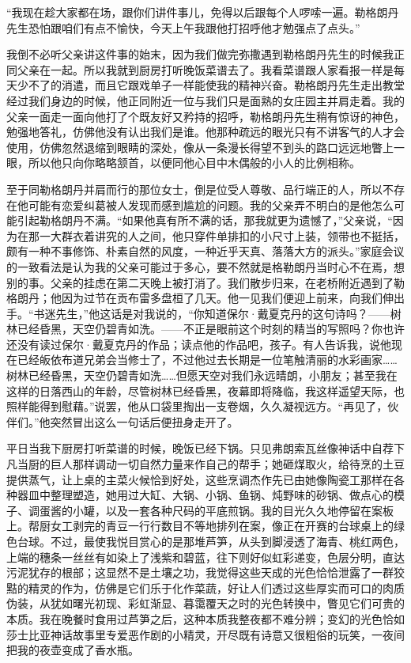 \par “我现在趁大家都在场，跟你们讲件事儿，免得以后跟每个人啰嗦一遍。勒格朗丹先生恐怕跟咱们有点不愉快，今天上午我跟他打招呼他才勉强点了点头。”
\par 我倒不必听父亲讲这件事的始末，因为我们做完弥撒遇到勒格朗丹先生的时候我正同父亲在一起。所以我就到厨房打听晚饭菜谱去了。我看菜谱跟人家看报一样是每天少不了的消遣，而且它跟戏单子一样能使我的精神兴奋。勒格朗丹先生走出教堂经过我们身边的时候，他正同附近一位与我们只是面熟的女庄园主并肩走着。我的父亲一面走一面向他打了个既友好又矜持的招呼，勒格朗丹先生稍有惊讶的神色，勉强地答礼，仿佛他没有认出我们是谁。他那种疏远的眼光只有不讲客气的人才会使用，仿佛忽然退缩到眼睛的深处，像从一条漫长得望不到头的路口远远地瞥上一眼，所以他只向你略略颔首，以便同他心目中木偶般的小人的比例相称。
\par 至于同勒格朗丹并肩而行的那位女士，倒是位受人尊敬、品行端正的人，所以不存在他可能有恋爱纠葛被人发现而感到尴尬的问题。我的父亲弄不明白的是他怎么可能引起勒格朗丹不满。“如果他真有所不满的话，那我就更为遗憾了，”父亲说，“因为在那一大群衣着讲究的人之间，他只穿件单排扣的小尺寸上装，领带也不挺括，颇有一种不事修饰、朴素自然的风度，一种近乎天真、落落大方的派头。”家庭会议的一致看法是认为我的父亲可能过于多心，要不然就是格勒朗丹当时心不在焉，想别的事。父亲的挂虑在第二天晚上被打消了。我们散步归来，在老桥附近遇到了勒格朗丹；他因为过节在贡布雷多盘桓了几天。他一见我们便迎上前来，向我们伸出手。“书迷先生，”他这话是对我说的，“你知道保尔·戴夏克丹的这句诗吗？——树林已经昏黑，天空仍碧青如洗。——不正是眼前这个时刻的精当的写照吗？你也许还没有读过保尔·戴夏克丹的作品；读点他的作品吧，孩子。有人告诉我，说他现在已经皈依布道兄弟会当修士了，不过他过去长期是一位笔触清丽的水彩画家……树林已经昏黑，天空仍碧青如洗……但愿天空对我们永远晴朗，小朋友；甚至我在这样的日落西山的年龄，尽管树林已经昏黑，夜幕即将降临，我这样遥望天际，也照样能得到慰藉。”说罢，他从口袋里掏出一支卷烟，久久凝视远方。“再见了，伙伴们。”他突然冒出这么一句话后便扭身走开了。
\par 平日当我下厨房打听菜谱的时候，晚饭已经下锅。只见弗朗索瓦丝像神话中自荐下凡当厨的巨人那样调动一切自然力量来作自己的帮手；她砸煤取火，给待烹的土豆提供蒸气，让上桌的主菜火候恰到好处，这些烹调杰作先已由她像陶瓷工那样在各种器皿中整理塑造，她用过大缸、大锅、小锅、鱼锅、炖野味的砂锅、做点心的模子、调蛋酱的小罐，以及一套各种尺码的平底煎锅。我的目光久久地停留在案板上。帮厨女工剥完的青豆一行行数目不等地排列在案，像正在开赛的台球桌上的绿色台球。不过，最使我悦目赏心的是那堆芦笋，从头到脚浸透了海青、桃红两色，上端的穗条一丝丝有如染上了浅紫和碧蓝，往下则好似虹彩递变，色层分明，直达污泥犹存的根部；这显然不是土壤之功，我觉得这些天成的光色恰恰泄露了一群狡黠的精灵的作为，仿佛是它们乐于化作菜蔬，好让人们透过这些厚实而可口的肉质伪装，从犹如曙光初现、彩虹渐显、暮霭覆天之时的光色转换中，瞥见它们可贵的本质。我在晚餐时食用过芦笋之后，这种本质我整夜都不难分辨；变幻的光色恰如莎士比亚神话故事里专爱恶作剧的小精灵，开尽既有诗意又很粗俗的玩笑，一夜间把我的夜壶变成了香水瓶。
